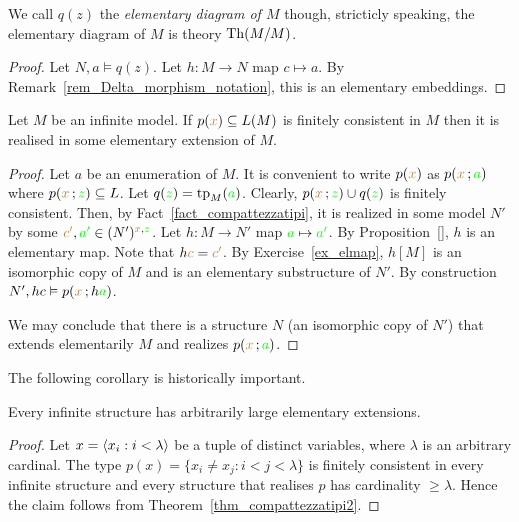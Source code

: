  We call $q(z)$ the \emph{elementary diagram of $M$} though, stricticly speaking, the elementary diagram of $M$ is theory ${\rm Th}(M/M)$.

\begin{proof}
    Let $N,a\models q(z)$.
    Let $h:M\to N$ map $c\mapsto a$.
    By Remark~\ref{rem_Delta_morphism_notation}, this is an elementary embeddings.
\end{proof}

\begin{void}\label{thm_compattezzatipi}
    Let $M$ be an infinite model.
    If $p({\color{brown} x})\subseteq L(M)$ is finitely consistent in $M$ then it is realised in some elementary extension of $M$.
\end{void}

\begin{proof}
  Let $a$ be an enumeration of $M$.
  It is convenient to write $p({\color{brown} x})$ as $p({\color{brown} x}\,;{\color{green} a})$ where $p({\color{brown} x}\,;{\color{green} z})\subseteq L$.
  Let $q({\color{green} z})={\rm tp}_M({\color{green} a})$.
  Clearly, $p({\color{brown} x}\,;{\color{green} z})\cup q({\color{green} z})$ is finitely consistent.
  Then, by Fact~\ref{fact_compattezzatipi}, it is realized in some model $N'$ by some ${\color{brown} c'},{\color{green} a'}\in (N')^{{\color{brown} x},{\color{green} z}}$.
  Let $h:M\to N'$ map ${\color{green} a}\mapsto {\color{green}a'}$.
  By Proposition~\ref{}, $h$ is an elementary map.
  Note that $h{\color{brown} c}={\color{brown} c'}$.
  By Exercise~\ref{ex_elmap}, $h[M]$ is an isomorphic copy of $M$ and is an elementary substructure of $N'$.
  By construction $N',hc\vDash p({\color{brown} x}\,;h{\color{green} a})$.

  We may conclude that there is a structure $N$ (an isomorphic copy of $N'$) that extends elementarily $M$ and realizes $p({\color{brown} x}\,;{\color{green} a})$.
\end{proof}

The following corollary is historically important.

\begin{void}
Every infinite structure has arbitrarily large elementary extensions.
\end{void}

\begin{proof}
Let $x=\langle x_i:i<\lambda\rangle$ be a tuple of distinct variables, where $\lambda$ is an arbitrary cardinal.
The type $p(x)=\big\{x_i\neq x_j: i<j<\lambda\big\}$ is finitely consistent in every infinite structure and every structure that realises $p$ has cardinality $\ge\lambda$.
Hence the claim follows from Theorem~\ref{thm_compattezzatipi2}.
\end{proof}


